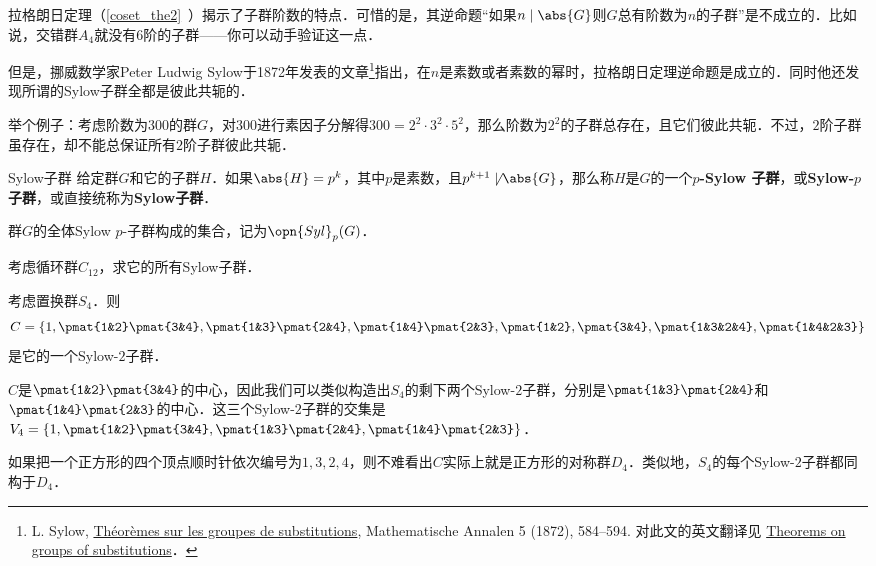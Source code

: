 



拉格朗日定理（\autoref{coset_the2}~）揭示了子群阶数的特点．可惜的是，其逆命题“如果$n\mid \abs{G}$则$G$总有阶数为$n$的子群”是不成立的．比如说，交错群$A_4$就没有$6$阶的子群——你可以动手验证这一点．

但是，挪威数学家Peter Ludwig Sylow于1872年发表的文章\footnote{L. Sylow, \href{https://eudml.org/doc/156588}{Théorèmes sur les groupes de substitutions}, Mathematische Annalen 5 (1872), 584–594. 对此文的英文翻译见 \href{http://www.maths.qmul.ac.uk/~raw/pubs_files/Sylow.pdf}{Theorems on groups of substitutions}．}指出，在$n$是素数或者素数的幂时，拉格朗日定理逆命题是成立的．同时他还发现所谓的Sylow子群全都是彼此共轭的．

举个例子：考虑阶数为$300$的群$G$，对$300$进行素因子分解得$300=2^2\cdot 3^2\cdot 5^2$，那么阶数为$2^2$的子群总存在，且它们彼此共轭．不过，$2$阶子群虽存在，却不能总保证所有$2$阶子群彼此共轭．


\begin{definition}{Sylow子群}\label{Sylow_def1}
给定群$G$和它的子群$H$．如果$\abs{H}=p^k$，其中$p$是素数，且$p^{k+1}\not\mid\abs{G}$，那么称$H$是$G$的一个$p$\textbf{-Sylow 子群}，或\textbf{Sylow-}$p$\textbf{子群}，或直接统称为\textbf{Sylow子群}．

群$G$的全体Sylow $p$-子群构成的集合，记为$\opn{Syl}_p(G)$．
\end{definition}



\begin{exercise}{}
考虑循环群$C_{12}$，求它的所有Sylow子群．
\end{exercise}

\begin{example}{}
考虑置换群$S_4$．则
\begin{equation}
C=\{1, \pmat{1&2}\pmat{3&4}, \pmat{1&3}\pmat{2&4}, \pmat{1&4}\pmat{2&3}, \pmat{1&2}, \pmat{3&4}, \pmat{1&3&2&4}, \pmat{1&4&2&3}\}
\end{equation}
是它的一个Sylow-$2$子群．

$C$是$\pmat{1&2}\pmat{3&4}$的中心，因此我们可以类似构造出$S_4$的剩下两个Sylow-$2$子群，分别是$\pmat{1&3}\pmat{2&4}$和$\pmat{1&4}\pmat{2&3}$的中心．这三个Sylow-$2$子群的交集是$V_4=\{1, \pmat{1&2}\pmat{3&4}, \pmat{1&3}\pmat{2&4}, \pmat{1&4}\pmat{2&3}\}$．

如果把一个正方形的四个顶点顺时针依次编号为$1, 3, 2, 4$，则不难看出$C$实际上就是正方形的对称群$D_4$．类似地，$S_4$的每个Sylow-$2$子群都同构于$D_4$．

\end{example}

